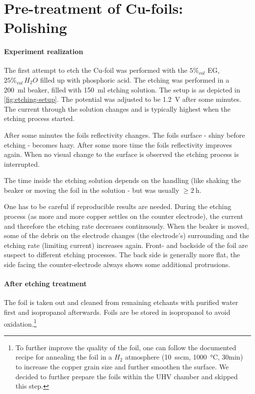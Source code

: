 \section{Pre-treatment of Cu-foils: Polishing}

\paragraph{Experiment realization}The first attempt to etch the Cu-foil was performed with the $5\%_{vol}$ EG, $25\%_{vol}\,H_2O$ filled up with phosphoric acid. The etching was performed in a \SI{200}{\ml} beaker, filled with \SI{150}{\ml} etching solution. The setup is as depicted in \autoref{fig:etching-setup}. The potential was adjusted to be \SI{1.2}{\V} after some minutes. The current through the solution changes and is typically highest when the etching process started. 

After some minutes the foils reflectivity changes. The foils surface - shiny before etching - becomes hazy. After some more time the foils reflectivity improves again. When no visual change to the surface is observed the etching process is interrupted. 

The time inside the etching solution depends on the handling (like shaking the beaker or moving the foil in the solution - but was usually $\geq \SI{2}{\hour}$.

One has to be careful if reproducible results are needed. During the etching process (as more and more copper settles on the counter electrode), the current and therefore the etching rate decreases continuously. When the beaker is moved, some of the debris on the electrode changes (the electrode's) surrounding and the etching rate (limiting current) increases again. 
Front- and backside of the foil are suspect to different etching processes. The back side is generally more flat, the side facing the counter-electrode always shows some additional protrusions.

\paragraph{After etching treatment}
The foil is taken out and cleaned from remaining etchants with purified water first and isopropanol afterwards. Foils are be stored in isopropanol to avoid oxidation.\footnote{To further improve the quality of the foil, one can follow the documented recipe for annealing the foil in a $H_2$ atmosphere (\SI{10}{sscm}, \SI{1000}{\celsius}, 30min)\cite{kim_synthesis_2012} to increase the copper grain size and further smoothen the surface. We decided to further prepare the foils within the UHV chamber and skipped this step.}

